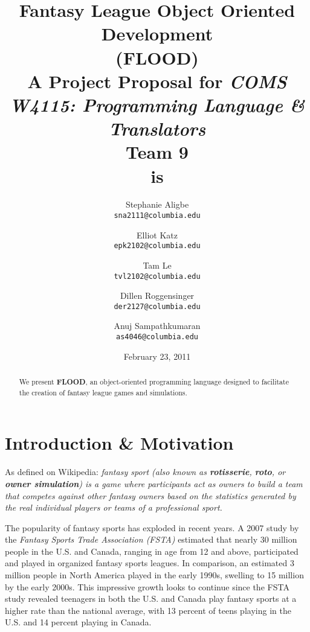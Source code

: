 \documentclass[12pt]{article}
\begin{document}
\title{
\textbf{Fantasy League Object Oriented Development}\\
\textbf{(FLOOD)}\\
{\small A Project Proposal for \textit{COMS W4115: Programming Language \& Translators}}\\
{\large \textbf{Team 9}}\\
\large{\textbf{is}}
}

\author{
  Stephanie Aligbe\\
  \texttt{\small{sna2111@columbia.edu}}
  \and
  Elliot Katz\\
  \texttt{\small{epk2102@columbia.edu}}
  \and
  Tam Le\\
  \texttt{\small{tvl2102@columbia.edu}}
  \and
  Dillen Roggensinger\\
  \texttt{\small{der2127@columbia.edu}}
  \and
  Anuj Sampathkumaran\\
  \texttt{\small{as4046@columbia.edu}}
}

\date{February 23, 2011}

\maketitle

\doublespacing

\begin{abstract}
We present \textbf{FLOOD}, an object-oriented programming language designed to facilitate the creation of fantasy league games and simulations. 
\begin{center}

\end{center}
\end{abstract}

\section{Introduction \& Motivation}

As defined on Wikipedia: \textit{fantasy sport (also known as \textbf{rotisserie}, \textbf{roto}, or \textbf{owner simulation}) is a game where participants act as owners to build a team that competes against other fantasy owners based on the statistics generated by the real individual players or teams of a professional sport.}

The popularity of fantasy sports has exploded in recent years. A 2007 study by the \textit{Fantasy Sports Trade Association (FSTA)} estimated that nearly 30 million people in the U.S. and Canada, ranging in age from 12 and above, participated and played in organized fantasy sports leagues. In comparison, an estimated 3 million people in North America played in the early 1990s, swelling to 15 million by the early 2000s. This impressive growth looks to continue since the FSTA study revealed teenagers in both the U.S. and Canada play fantasy sports at a higher rate than the national average, with 13 percent of teens playing in the U.S. and 14 percent playing in Canada.
\end{document}
